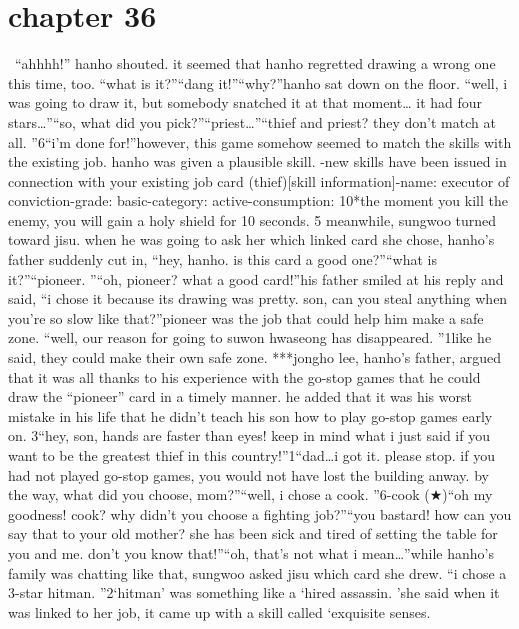 \section{chapter 36}






 “ahhhh!” hanho shouted.
it seemed that hanho regretted drawing a wrong one this time, too.
“what is it?”“dang it!”“why?”hanho sat down on the floor.
“well, i was going to draw it, but somebody snatched it at that moment… it had four stars…”“so, what did you pick?”“priest…”“thief and priest? they don’t match at all.
”6“i’m done for!”however, this game somehow seemed to match the skills with the existing job.
hanho was given a plausible skill.
-new skills have been issued in connection with your existing job card (thief)[skill information]-name: executor of conviction-grade: basic-category: active-consumption: 10*the moment you kill the enemy, you will gain a holy shield for 10 seconds.
5
meanwhile, sungwoo turned toward jisu.
 when he was going to ask her which linked card she chose, hanho’s father suddenly cut in, “hey, hanho.
 is this card a good one?”“what is it?”“pioneer.
”“oh, pioneer? what a good card!”his father smiled at his reply and said, “i chose it because its drawing was pretty.
 son, can you steal anything when you’re so slow like that?”pioneer was the job that could help him make a safe zone.
“well, our reason for going to suwon hwaseong has disappeared.
”1like he said, they could make their own safe zone.
***jongho lee, hanho’s father, argued that it was all thanks to his experience with the go-stop games that he could draw the “pioneer” card in a timely manner.
 he added that it was his worst mistake in his life that he didn’t teach his son how to play go-stop games early on.
3“hey, son, hands are faster than eyes! keep in mind what i just said if you want to be the greatest thief in this country!”1“dad…i got it.
 please stop.
 if you had not played go-stop games, you would not have lost the building anway.
 by the way, what did you choose, mom?”“well, i chose a cook.
”6-cook (★)“oh my goodness! cook? why didn’t you choose a fighting job?”“you bastard! how can you say that to your old mother? she has been sick and tired of setting the table for you and me.
 don’t you know that!”“oh, that’s not what i mean…”while hanho’s family was chatting like that, sungwoo asked jisu which card she drew.
“i chose a 3-star hitman.
”2‘hitman’ was something like a ‘hired assassin.
’she said when it was linked to her job, it came up with a skill called ‘exquisite senses.
